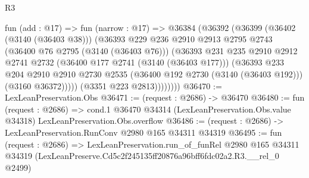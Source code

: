 \begin{lexlean}{R3}
\begin{coremodule}
              fun (add : @17) =>
              fun (narrow : @17) =>
              @36384
                (@36392
                  (@36399
                    (@36402 (@3140 (@36403 @38)))
                    (@36393
                      @229
                      @236
                      @2910
                      @2913
                      @2795
                      @2743
                      (@36400 @76 @2795 (@3140 (@36403 @76)))
                      (@36393
                        @231
                        @235
                        @2910
                        @2912
                        @2741
                        @2732
                        (@36400 @177 @2741 (@3140 (@36403 @177)))
                        (@36393
                          @233
                          @204
                          @2910
                          @2910
                          @2730
                          @2535
                          (@36400 @192 @2730 (@3140 (@36403 @192)))
                          (@3160 @36372)))))
                  (@3351 @223 @2813))))))))
@36470 := LexLeanPreservation.Obs
@36471 := (request : @2686) -> @36470
@36480 := fun (request : @2686) =>
  cond.{1} @36470 @34314 (LexLeanPreservation.Obs.value @34318) LexLeanPreservation.Obs.overflow
@36486 := (request : @2686) -> LexLeanPreservation.RunConv @2980 @165 @34311 @34319
@36495 := fun (request : @2686) =>
  LexLeanPreservation.run_of_funRel
    @2980
    @165
    @34311
    @34319
    (LexLeanPreserve.Cd5c2f245135ff20876a96bff6fdc02a2.R3.__rel_0 @2499)
\end{coremodule}
\end{lexlean}
